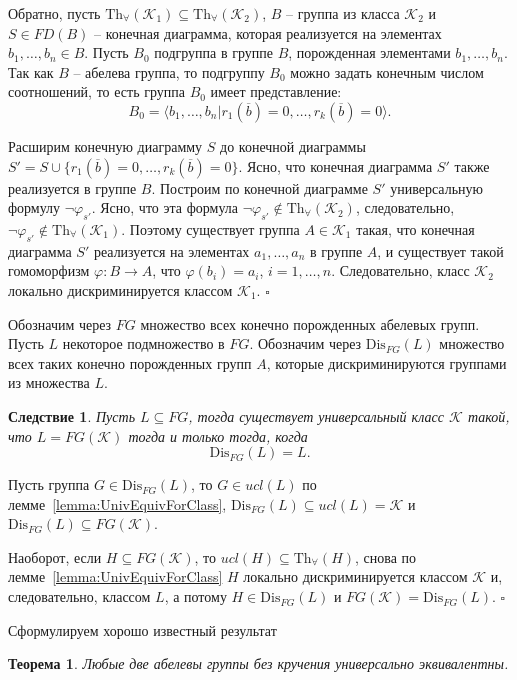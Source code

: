 \documentclass[a4paper,11pt,twoside]{article}
\newtheorem{theorem}{Теорема}[section]
\newtheorem{corollary}{Следствие}[section]
\def\proof{{\noindent{\bf Доказательство.}} }
\def\K{{\mathcal{K}}}
\def\Tha{{\mathrm{Th}_\forall}}
\def\Dis{{\mathrm{Dis}}}
\begin{document}
Обратно, пусть $\Tha(\K_1) \subseteq \Tha(\K_2)$, $B$ -- группа из класса $\K_2$ и $S \in FD(B)$ -- конечная диаграмма, которая реализуется на элементах $b_1, \ldots, b_n \in B$. Пусть $B_0$ подгруппа в группе $B$, порожденная элементами $b_1, \ldots, b_n$. Так как $B$ -- абелева группа, то подгруппу $B_0$ можно задать конечным числом соотношений, то есть группа $B_0$ имеет представление:
 $$B_0 = \langle b_1, \ldots, b_n | r_1(\overline{b}) = 0, \ldots, r_k(\overline{b}) = 0 \rangle.$$

Расширим конечную диаграмму $S$ до конечной диаграммы $S' = S \cup \{r_1(\overline{b}) = 0, \ldots, r_k(\overline{b}) = 0\}$. Ясно, что конечная диаграмма $S'$ также реализуется в группе $B$. Построим по конечной диаграмме $S'$ универсальную формулу $\neg\varphi_{s'}$. Ясно, что эта формула $\neg\varphi_{s'} \notin \Tha(\K_2)$, следовательно, $\neg\varphi_{s'} \notin \Tha(\K_1)$. Поэтому существует группа $A \in \K_1$ такая, что конечная диаграмма $S'$ реализуется на элементах $a_1, \ldots, a_n$ в группе $A$, и существует такой гомоморфизм $\varphi: B \rightarrow A$, что $\varphi(b_i) = a_i$, $i = 1, \ldots, n$. Следовательно, класс $\K_2$ локально дискриминируется классом $\K_1$. $\square$


Обозначим через $FG$ множество всех конечно порожденных абелевых групп. Пусть $L$ некоторое подмножество в $FG$. Обозначим через $\Dis_{FG}(L)$ множество всех таких конечно порожденных групп $A$, которые дискриминируются группами из множества $L$.

\begin{corollary}\label{cor:LisFGbyK}
Пусть $L \subseteq FG$, тогда существует универсальный класс $\K$ такой, что $L = FG(\K)$ тогда и только тогда, когда
$$\Dis_{FG}(L) = L.$$
\end{corollary}

\proof Пусть группа $G \in \Dis_{FG}(L)$, то $G \in ucl(L)$ по лемме~\ref{lemma:UnivEquivForClass}, $\Dis_{FG}(L) \subseteq ucl(L) = \K$ и $\Dis_{FG}(L) \subseteq FG(\K)$.

Наоборот, если $H \subseteq FG(\K)$, то $ucl(H) \subseteq \Tha(H)$, снова по лемме~\ref{lemma:UnivEquivForClass} $H$ локально дискриминируется классом $\K$ и, следовательно, классом $L$, а потому $H \in \Dis_{FG}(L)$ и $FG(\K) = \Dis_{FG}(L)$. $\square$



Сформулируем хорошо известный результат

\begin{theorem}\label{th:AbelUnivEquiv}
Любые две абелевы группы без кручения универсально эквивалентны.
\end{theorem}
\end{document}
